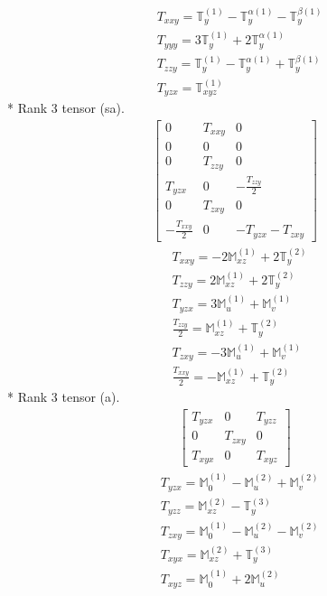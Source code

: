 \documentclass[fleqn,8pt,landscape]{jsarticle}
\begin{document}
\begin{align*}
& T_{xxy} = \mathbb{T}_{y}^{(1)} - \mathbb{T}_{y}^{\alpha(1)} - \mathbb{T}_{y}^{\beta(1)} \\
& T_{yyy} = 3 \mathbb{T}_{y}^{(1)} + 2 \mathbb{T}_{y}^{\alpha(1)} \\
& T_{zzy} = \mathbb{T}_{y}^{(1)} - \mathbb{T}_{y}^{\alpha(1)} + \mathbb{T}_{y}^{\beta(1)} \\
& T_{yzx} = \mathbb{T}_{xyz}^{(1)}
\end{align*}
* Rank 3 tensor (sa).
\begin{align*}
\begin{bmatrix} 0 & T_{xxy} & 0 \\ 0 & 0 & 0 \\ 0 & T_{zzy} & 0 \\ T_{yzx} & 0 & - \frac{T_{zzy}}{2} \\ 0 & T_{zxy} & 0 \\ - \frac{T_{xxy}}{2} & 0 & - T_{yzx} - T_{zxy} \end{bmatrix}
\end{align*}
\begin{align*}
& T_{xxy} = - 2 \mathbb{M}_{xz}^{(1)} + 2 \mathbb{T}_{y}^{(2)} \\
& T_{zzy} = 2 \mathbb{M}_{xz}^{(1)} + 2 \mathbb{T}_{y}^{(2)} \\
& T_{yzx} = 3 \mathbb{M}_{u}^{(1)} + \mathbb{M}_{v}^{(1)} \\
& \frac{T_{zzy}}{2} = \mathbb{M}_{xz}^{(1)} + \mathbb{T}_{y}^{(2)} \\
& T_{zxy} = - 3 \mathbb{M}_{u}^{(1)} + \mathbb{M}_{v}^{(1)} \\
& \frac{T_{xxy}}{2} = - \mathbb{M}_{xz}^{(1)} + \mathbb{T}_{y}^{(2)}
\end{align*}
* Rank 3 tensor (a).
\begin{align*}
\begin{bmatrix} T_{yzx} & 0 & T_{yzz} \\ 0 & T_{zxy} & 0 \\ T_{xyx} & 0 & T_{xyz} \end{bmatrix}
\end{align*}
\begin{align*}
& T_{yzx} = \mathbb{M}_{0}^{(1)} - \mathbb{M}_{u}^{(2)} + \mathbb{M}_{v}^{(2)} \\
& T_{yzz} = \mathbb{M}_{xz}^{(2)} - \mathbb{T}_{y}^{(3)} \\
& T_{zxy} = \mathbb{M}_{0}^{(1)} - \mathbb{M}_{u}^{(2)} - \mathbb{M}_{v}^{(2)} \\
& T_{xyx} = \mathbb{M}_{xz}^{(2)} + \mathbb{T}_{y}^{(3)} \\
& T_{xyz} = \mathbb{M}_{0}^{(1)} + 2 \mathbb{M}_{u}^{(2)}
\end{align*}
\end{document}
